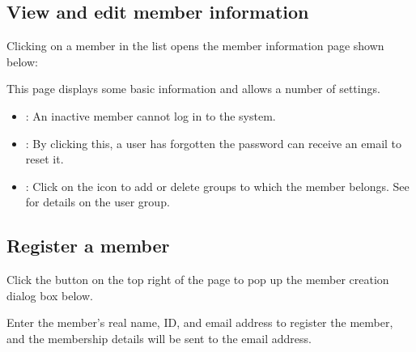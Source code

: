 \documentclass[letterpaper,10pt,english]{sphinxmanual}
\begin{document}
\subsection{View and edit member information}
\label{\detokenize{discovery/part08/members:id3}}
Clicking on a member in the list opens the member information page shown below:
\begin{quote}

\begin{figure}[H]
\centering

\noindent{}
\end{figure}
\end{quote}

This page displays some basic information and allows a number of settings.
\begin{itemize}
\item {} 
: An inactive member cannot log in to the system.

\item {} 
: By clicking this, a user has forgotten the password can receive an email to reset it.

\item {} 
: Click on the  icon to add or delete groups to which the member belongs. See {\hyperref[\detokenize{discovery/part08/groups:user-groups}]{}} for details on the user group.

\end{itemize}


\subsection{Register a member}
\label{\detokenize{discovery/part08/members:user-registration}}\label{\detokenize{discovery/part08/members:id4}}
Click the  button on the top right of the page to pop up the member creation dialog box below.
\begin{quote}

\begin{figure}[H]
\centering

\noindent{}
\end{figure}
\end{quote}

Enter the member’s real name, ID, and email address to register the member, and the membership details will be sent to the email address.
\end{document}
